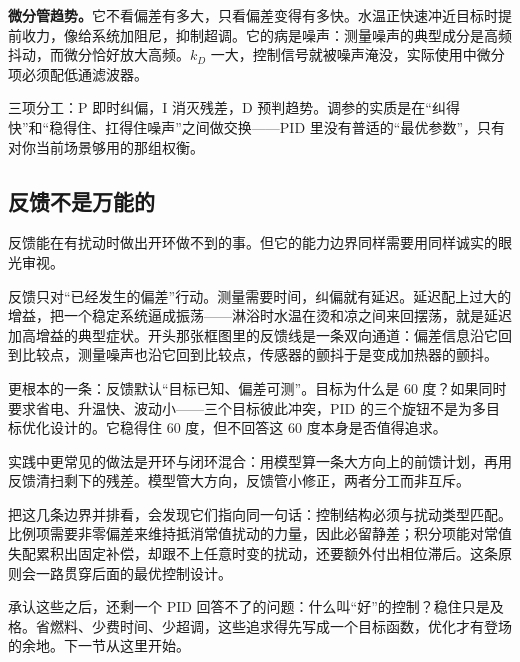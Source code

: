 \textbf{微分管趋势。}它不看偏差有多大，只看偏差变得有多快。水温正快速冲近目标时提前收力，像给系统加阻尼，抑制超调。它的病是噪声：测量噪声的典型成分是高频抖动，而微分恰好放大高频。\(k_D\) 一大，控制信号就被噪声淹没，实际使用中微分项必须配低通滤波器。

三项分工：P 即时纠偏，I 消灭残差，D 预判趋势。调参的实质是在``纠得快''和``稳得住、扛得住噪声''之间做交换——PID 里没有普适的``最优参数''，只有对你当前场景够用的那组权衡。

\subsection{反馈不是万能的}

反馈能在有扰动时做出开环做不到的事。但它的能力边界同样需要用同样诚实的眼光审视。

反馈只对``已经发生的偏差''行动。测量需要时间，纠偏就有延迟。延迟配上过大的增益，把一个稳定系统逼成振荡——淋浴时水温在烫和凉之间来回摆荡，就是延迟加高增益的典型症状。开头那张框图里的反馈线是一条双向通道：偏差信息沿它回到比较点，测量噪声也沿它回到比较点，传感器的颤抖于是变成加热器的颤抖。

更根本的一条：反馈默认``目标已知、偏差可测''。目标为什么是 60 度？如果同时要求省电、升温快、波动小——三个目标彼此冲突，PID 的三个旋钮不是为多目标优化设计的。它稳得住 60 度，但不回答这 60 度本身是否值得追求。

实践中更常见的做法是开环与闭环混合：用模型算一条大方向上的前馈计划，再用反馈清扫剩下的残差。模型管大方向，反馈管小修正，两者分工而非互斥。

把这几条边界并排看，会发现它们指向同一句话：控制结构必须与扰动类型匹配。比例项需要非零偏差来维持抵消常值扰动的力量，因此必留静差；积分项能对常值失配累积出固定补偿，却跟不上任意时变的扰动，还要额外付出相位滞后。这条原则会一路贯穿后面的最优控制设计。

承认这些之后，还剩一个 PID 回答不了的问题：什么叫``好''的控制？稳住只是及格。省燃料、少费时间、少超调，这些追求得先写成一个目标函数，优化才有登场的余地。下一节从这里开始。
